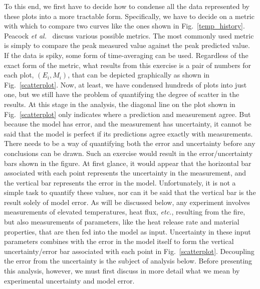 To this end, we first have to decide how to condense all the data represented by these plots into a more tractable form. Specifically, we
have to decide on a metric with which to compare two curves like the ones shown in Fig.~\ref{temp_history}. Peacock {\em et al.}~\cite{Peacock:FSJ1999} discuss various possible metrics. The most commonly used metric is simply to compare the peak measured value against the peak
predicted value. If the data is spiky, some form of time-averaging can be used. Regardless of the exact form of the metric, what results from
this exercise is a pair of numbers for each plot, $(E_i,M_i)$, that can be depicted graphically as shown in Fig.~\ref{scatterplot}. Now, at least, we have
condensed hundreds of plots into just one, but we still have the problem of quantifying the degree of scatter in the results. At this stage in the analysis, the
diagonal line on the plot shown in Fig.~\ref{scatterplot} only indicates where a prediction and measurement agree. But because the model has error, and
the measurement has uncertainty, it cannot be said that the model is perfect if its predictions agree exactly with measurements. There needs to be a way of quantifying
both the error and uncertainty before any conclusions can be drawn.
Such an exercise would result in the error/uncertainty bars shown in the figure. At first glance, it would appear that the
horizontal bar associated with each point represents the uncertainty in the measurement, and the vertical bar represents the error in the model. Unfortunately, it
is not a simple task to quantify these values, nor can it be said that the vertical bar is the result solely of model error. As will be discussed below, any
experiment involves measurements of elevated temperatures, heat flux, {\em etc.}, resulting from the fire, but also measurements of parameters, like the
heat release rate and material properties, that are then fed into the model as input. Uncertainty in these input parameters combines with the error in the model
itself to form the vertical uncertainty/error bar associated with each point in Fig.~\ref{scatterplot}. Decoupling the error from the uncertainty
is the subject of analysis below. Before presenting this
analysis, however, we must first discuss in more detail what we mean by experimental uncertainty and model error.

